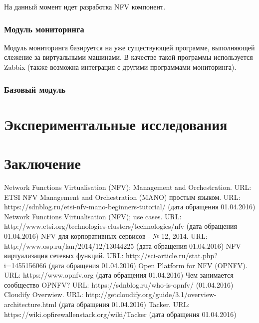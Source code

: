 \documentclass[oneside,final,14pt,a4paper]{extreport}
\begin{document}
На данный момент идет разработка NFV компонент.

\subsection{Модуль мониторинга}
Модуль мониторинга базируется на уже существующей программе, выполняющей слежение за виртуальными машинами. В качестве такой программы используется Zabbix (также возможна интеграция с другими программами мониторинга).


\subsection{Базовый модуль }



\chapter{Экспериментальные исследования}

\chapter*{Заключение}


\begin{thebibliography}{00}
 Network Functions Virtualisation (NFV); Management and Orchestration. URL: %
 ETSI NFV Management and Orchestration (MANO) простым языком. URL: https://sdnblog.ru/etsi-nfv-mano-beginners-tutorial/ (дата обращения 01.04.2016)
 Network Functions Virtualisation (NFV); use cases. URL: http://www.etsi.org/technologies-clusters/technologies/nfv (дата обращения 01.04.2016)
 NFV для корпоративных сервисов - № 12, 2014. URL: http://www.osp.ru/lan/2014/12/13044225 (дата обращения 01.04.2016)
 NFV виртуализация сетевых функций. URL: http://sci-article.ru/stat.php?i=1455156066 (дата обращения 01.04.2016)
 Open Platform for NFV (OPNFV). URL: https://www.opnfv.org (дата обращения 01.04.2016)
 Чем занимается сообщество OPNFV? URL:  https://sdnblog.ru/who-is-opnfv/ (01.04.2016)
 Cloudify Overwiew. URL: http://getcloudify.org/guide/3.1/overview-architecture.html (дата обращения 01.04.2016)
 Tacker. URL: https://wiki.opfirewallenstack.org/wiki/Tacker (дата обращения 01.04.2016)
\end{thebibliography}

\end{document}
